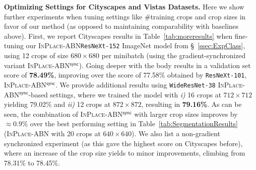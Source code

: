\documentclass[10pt,twocolumn,letterpaper]{article}
\newcommand{\bnInplace}{\textsc{InPlace-ABN}\xspace}
\newcommand{\bnInplaceSync}{\textsc{InPlace-ABN$^{\mathsf{sync}}$}\xspace}
\newcommand{\myparagraph}[1]{\vspace{5pt}\noindent\textbf{#1}}
\begin{document}
\myparagraph{Optimizing Settings for Cityscapes and Vistas Datasets.}
Here we show further experiments when tuning settings like \#training crops and crop sizes in favor of our method (as opposed to maintaining comparability with baselines above). 
First, we report Cityscapes results in Table~\ref{tab:moreresults} when fine-tuning our \bnInplace \texttt{ResNeXt-152} ImageNet model from \S~\ref{ssec:ExpClass}, using 12 crops of size $680\times680$ per minibatch (using the gradient-synchronized variant \bnInplaceSync). Going deeper with the body results in a validation set score of \textbf{78.49\%}, improving over the score of 77.58\% obtained by \texttt{ResNeXt-101}, \bnInplaceSync. We provide additional results using \texttt{WideResNet-38} \bnInplaceSync-based settings, where we trained the model with \textit{i)} 16 crops at $712\times712$ yielding 79.02\% and \textit{ii)} 12 crops at $872\times872$, resulting in \textbf{79.16\%}. As can be seen, the combination of \bnInplaceSync with larger crop sizes improves by $\approx0.9\%$ over the best performing setting in Table~\ref{tab:SegmentationResults} (\bnInplace with 20 crops at $640\times640$). We also list a non-gradient synchronized experiment (as this gave the highest score on Cityscapes before), where an increase of the crop size yields to minor improvements, climbing from 78.31\% to 78.45\%. 
\end{document}
